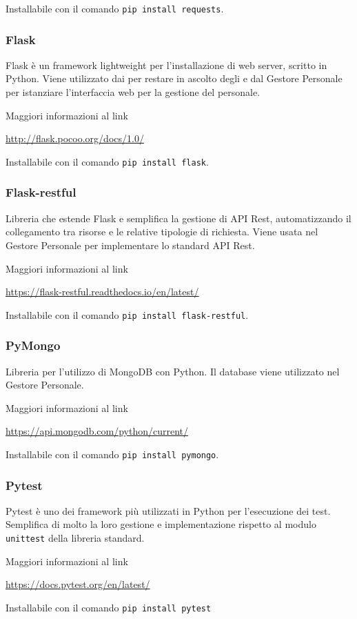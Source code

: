 Installabile con il comando \texttt{pip install requests}.

\subsubsection{Flask}
Flask è un framework lightweight per l'installazione di web server, scritto in Python.
Viene utilizzato dai  per restare in ascolto degli  e dal Gestore Personale per istanziare l'interfaccia
web per la gestione del personale.

Maggiori informazioni al link

\begin{center}
    \url{http://flask.pocoo.org/docs/1.0/}
\end{center}

Installabile con il comando \texttt{pip install flask}.

\subsubsection{Flask-restful}
Libreria che estende Flask e semplifica la gestione di API Rest, automatizzando il collegamento tra risorse e le relative tipologie di richiesta.
Viene usata nel Gestore Personale per implementare lo standard API Rest.

Maggiori informazioni al link

\begin{center}
    \url{https://flask-restful.readthedocs.io/en/latest/}
\end{center}

Installabile con il comando \texttt{pip install flask-restful}.

\subsubsection{PyMongo}

Libreria per l'utilizzo di MongoDB con Python. Il database viene utilizzato nel Gestore Personale.

Maggiori informazioni al link

\begin{center}
    \url{https://api.mongodb.com/python/current/}
\end{center}

Installabile con il comando \texttt{pip install pymongo}.

\subsubsection{Pytest}
Pytest è uno dei framework più utilizzati in Python per l'esecuzione dei test. Semplifica di molto la loro gestione e implementazione rispetto al modulo \texttt{unittest}
della libreria standard.

Maggiori informazioni al link

\begin{center}
    \url{https://docs.pytest.org/en/latest/}
\end{center}

Installabile con il comando \texttt{pip install pytest}
